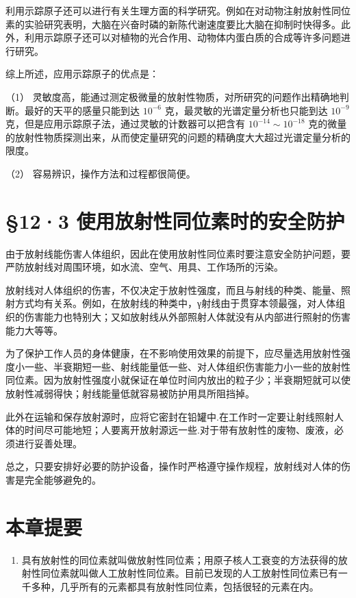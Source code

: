 利用示踪原子还可以进行有关生理方面的科学研究。例如在对动物注射放射性同位素的实验研究表明，大脑在兴奋时磷的新陈代谢速度要比大脑在抑制时快得多。此外，利用示踪原子还可以对植物的光合作用、动物体内蛋白质的合成等许多问题进行研究。

综上所述，应用示踪原子的优点是：

（1）
灵敏度高，能通过测定极微量的放射性物质，对所研究的问题作出精确地判断。最好的天平的感量只能到达
\(10^{-6}\) 克，最灵敏的光谱定量分析也只能到达 \(10^{-9}\)
克，但是应用示踪原子法，通过灵敏的计数器可以把含有
\(10^{-14} \sim 10^{-18}\)
克的微量的放射性物质探测出来，从而使定量研究的问题的精确度大大超过光谱定量分析的限度。

（2） 容易辨识，操作方法和过程都很简便。

\section{§12·3
使用放射性同位素时的安全防护}

由于放射线能伤害人体组织，因此在使用放射性同位素时要注意安全防护问题，要严防放射线对周围环境，如水流、空气、用具、工作场所的污染。

放射线对人体组织的伤害，不仅决定于放射性强度，而且与射线的种类、能量、照射方式均有关系。例如，在放射线的种类中，γ射线由于贯穿本领最强，对人体组织的伤害能力也特别大；又如放射线从外部照射人体就没有从内部进行照射的伤害能力大等等。

为了保护工作人员的身体健康，在不影响使用效果的前提下，应尽量选用放射性强度小一些、半衰期短一些、射线能量低一些、对人体组织伤害能力小一些的放射性同位素。因为放射性强度小就保证在单位时间内放出的粒子少；半衰期短就可以使放射性减弱得快；射线能量低就容易被防护用具所阻挡掉。

此外在运输和保存放射源时，应将它密封在铅罐中.在工作时一定要让射线照射人体的时间尽可能地短；人要离开放射源远一些.对于带有放射性的废物、废液，必须进行妥善处理。

总之，只要安排好必要的防护设备，操作时严格遵守操作规程，放射线对人体的伤害是完全能够避免的。

\section{本章提要}

\begin{enumerate}
\item
  具有放射性的同位素就叫做放射性同位素；用原子核人工衰变的方法获得的放射性同位素就叫做人工放射性同位素。目前已发现的人工放射性同位素已有一千多种，几乎所有的元素都具有放射性同位素，包括很轻的元素在内。
\end{enumerate}

